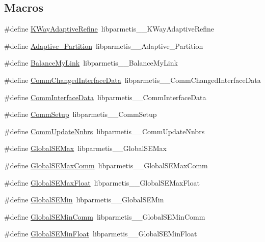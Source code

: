 \subsection*{Macros}
\begin{DoxyCompactItemize}
\item 
\#define \hyperlink{a00960_ad15569e7f8f0d93d29bd736fb6e384ed}{K\+Way\+Adaptive\+Refine}~libparmetis\+\_\+\+\_\+\+K\+Way\+Adaptive\+Refine
\item 
\#define \hyperlink{a00960_a24a1cbca9cefe2f85f33b973375db8d4}{Adaptive\+\_\+\+Partition}~libparmetis\+\_\+\+\_\+\+Adaptive\+\_\+\+Partition
\item 
\#define \hyperlink{a00960_aadb2a7045320bbd460294e6c0d500cdf}{Balance\+My\+Link}~libparmetis\+\_\+\+\_\+\+Balance\+My\+Link
\item 
\#define \hyperlink{a00960_a3d09a4051b0e1458b4777ac5da865105}{Comm\+Changed\+Interface\+Data}~libparmetis\+\_\+\+\_\+\+Comm\+Changed\+Interface\+Data
\item 
\#define \hyperlink{a00960_ab8b4f91d6c546ff88d3d8926d2609e49}{Comm\+Interface\+Data}~libparmetis\+\_\+\+\_\+\+Comm\+Interface\+Data
\item 
\#define \hyperlink{a00960_a8247e54e9e936d99c991d14d3f5ba03a}{Comm\+Setup}~libparmetis\+\_\+\+\_\+\+Comm\+Setup
\item 
\#define \hyperlink{a00960_a2a214e4d74f72596b351948cf0bdd344}{Comm\+Update\+Nnbrs}~libparmetis\+\_\+\+\_\+\+Comm\+Update\+Nnbrs
\item 
\#define \hyperlink{a00960_a9a4ecf057da33ad38f030005cde16378}{Global\+S\+E\+Max}~libparmetis\+\_\+\+\_\+\+Global\+S\+E\+Max
\item 
\#define \hyperlink{a00960_ab53a011b367567903bcf506320fd359a}{Global\+S\+E\+Max\+Comm}~libparmetis\+\_\+\+\_\+\+Global\+S\+E\+Max\+Comm
\item 
\#define \hyperlink{a00960_a8ea7b6314a0b4ebf58b5d918b01cfdbc}{Global\+S\+E\+Max\+Float}~libparmetis\+\_\+\+\_\+\+Global\+S\+E\+Max\+Float
\item 
\#define \hyperlink{a00960_ae906896a6099a3c0141f583e595ee6dd}{Global\+S\+E\+Min}~libparmetis\+\_\+\+\_\+\+Global\+S\+E\+Min
\item 
\#define \hyperlink{a00960_ae29a05f620e87279ed0678fd531e08c0}{Global\+S\+E\+Min\+Comm}~libparmetis\+\_\+\+\_\+\+Global\+S\+E\+Min\+Comm
\item 
\#define \hyperlink{a00960_abeccfe86c382c222f468c48c10ff72f8}{Global\+S\+E\+Min\+Float}~libparmetis\+\_\+\+\_\+\+Global\+S\+E\+Min\+Float
\item 

\end{DoxyCompactItemize}
